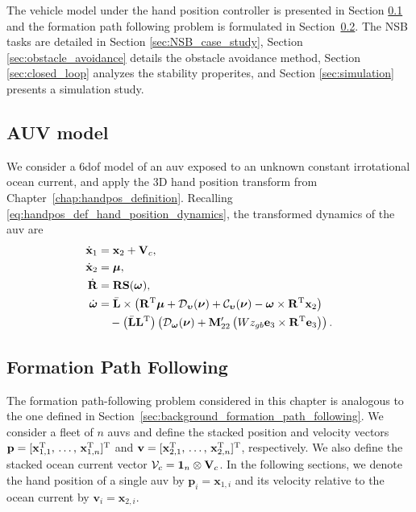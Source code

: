 The vehicle model under the hand position controller is presented in Section \ref{sec:vehicle_model} and the formation path following problem is formulated in Section~\ref{sec:formation_path_following}. The NSB tasks are detailed in Section \ref{sec:NSB_case_study}, Section \ref{sec:obstacle_avoidance} details the obstacle avoidance method, Section \ref{sec:closed_loop} analyzes the stability properites, and Section \ref{sec:simulation} presents a simulation study.

\subsection{AUV model}\label{sec:vehicle_model}
We consider a 6\gls{dof} model of an \gls{auv} exposed to an unknown constant irrotational ocean current, and apply the 3D hand position transform from Chapter~\ref{chap:handpos_definition}.
Recalling \eqref{eq:handpos_def_hand_position_dynamics}, the transformed dynamics of the \gls{auv} are
\begin{subequations}\label{eq:linearized_system}
    \begin{align}
        \dot{\mathbf{x}}_1 &= \mathbf{x}_2 + \mathbf{V}_c,\\
        \dot{\mathbf{x}}_2 &= \bm{\mu},\\
        \dot{\mathbf{R}} &=  \mathbf{R} \mathbf{S}(\bm{\omega}),\\
        \dot{\bm{\omega}} &= \Bar{\mathbf{L}} \times \left(\mathbf{R}^{\mathrm{T}}\bm{\mu} + \mathcal{D}_{\bm{\upsilon}}(\bm{\nu}) + \mathcal{C}_{\bm{\upsilon}}(\bm{\nu}) - \bm{\omega} \times \mathbf{R}^{\mathrm{T}} \mathbf{x}_2\right) \label{eq:internal_dynamics} \\
            & \quad - \left(\Bar{\mathbf{L}}\mathbf{L}^{\mathrm{T}}\right) \left(\mathcal{D}_{\bm{\omega}}(\bm{\nu}) + \mathbf{M}_{22}^{\prime}\left(Wz_{gb} \mathbf{e}_3 \times \mathbf{R}^{\mathrm{T}} \mathbf{e}_3\right)\right). \nonumber
    \end{align}
\end{subequations}

\subsection{Formation Path Following}\label{sec:formation_path_following}
The formation path-following problem considered in this chapter is analogous to the one defined in Section~\ref{sec:background_formation_path_following}.
We consider a fleet of $n$ \glspl{auv} and define the stacked position and velocity vectors $\mathbf{p} = [\mathbf{x}_{1,1}^{\mathrm{T}}, \, \ldots,\, \mathbf{x}_{1,n}^{\mathrm{T}}]^{\mathrm{T}}$ and $\mathbf{v} = [\mathbf{x}_{2,1}^{\mathrm{T}}, \, \ldots,\, \mathbf{x}_{2,n}^{\mathrm{T}}]^{\mathrm{T}}$, respectively. We also define the stacked ocean current vector $\mathcal{V}_c = \mathbf{1}_{n} \otimes \mathbf{V}_c$. In the following sections, we denote the hand position of a single \gls{auv} by $\mathbf{p}_i = \mathbf{x}_{1,i}$ and its velocity relative to the ocean current by $\mathbf{v}_i = \mathbf{x}_{2,i}$.

